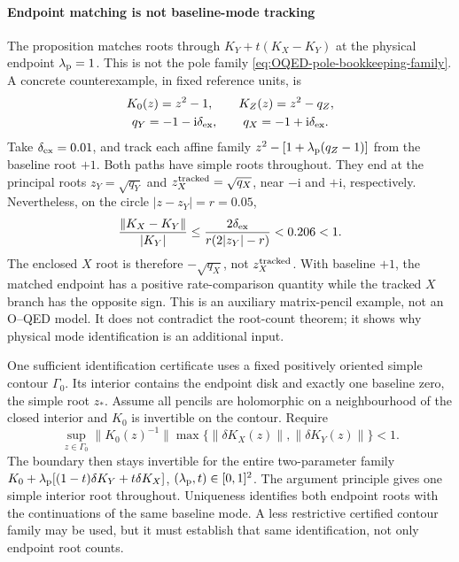 \documentclass[final,5p,times,twocolumn,numbers,nopreprintline]{elsarticle}
\numberwithin{equation}{section}
\theoremstyle{definition}
\theoremstyle{remark}
\newcommand{\ii}{\mathrm i}
\begin{document}
\paragraph{Endpoint matching is not baseline-mode tracking}
The proposition matches roots through \(K_Y+t(K_X-K_Y)\) at the
physical endpoint \(\lambda_{\rm p}=1\). This is not the pole family
\eqref{eq:OQED-pole-bookkeeping-family}. A concrete counterexample,
in fixed reference units, is
\[
 \begin{gathered}
 K_0(z)=z^2-1,\qquad K_Z(z)=z^2-q_Z,\\
 q_Y=-1-\ii\delta_{\rm ex},\qquad q_X=-1+\ii\delta_{\rm ex}.
 \end{gathered}
\]
Take \(\delta_{\rm ex}=0.01\), and track each affine family
\(z^2-[1+\lambda_{\rm p}(q_Z-1)]\) from the baseline root \(+1\).
Both paths have simple roots throughout. They end at the principal
roots \(z_Y=\sqrt{q_Y}\) and \(z_X^{\rm tracked}=\sqrt{q_X}\),
near \(-\ii\) and \(+\ii\), respectively. Nevertheless, on the
circle \(|z-z_Y|=r=0.05\),
\[
 \frac{\|K_X-K_Y\|}{|K_Y|}
 \leq\frac{2\delta_{\rm ex}}{r(2|z_Y|-r)}<0.206<1.
\]
The enclosed \(X\) root is therefore \(-\sqrt{q_X}\), not
\(z_X^{\rm tracked}\). With baseline \(+1\), the matched endpoint
has a positive rate-comparison quantity while the tracked \(X\) branch
has the opposite sign. This is an auxiliary matrix-pencil example, not an O--QED model. It
does not contradict the root-count theorem; it shows why physical mode
identification is an additional input.

One sufficient identification certificate uses a fixed positively
oriented simple contour \(\Gamma_0\). Its interior contains the endpoint
disk and exactly one baseline zero, the simple root \(z_*\). Assume
all pencils are holomorphic on a neighbourhood of the closed interior
and \(K_0\) is invertible on the contour. Require
\begin{equation}
 \sup_{z\in\Gamma_0}\|K_0(z)^{-1}\|
       \max\{\|\delta K_X(z)\|,\|\delta K_Y(z)\|\}<1.
 \label{eq:OQED-common-baseline-contour}
\end{equation}
The boundary then stays invertible for the entire two-parameter family
\(K_0+\lambda_{\rm p}[(1-t)\delta K_Y+t\delta K_X]\),
\((\lambda_{\rm p},t)\in[0,1]^2\). The argument principle gives
one simple interior root throughout. Uniqueness identifies both endpoint
roots with the continuations of the same baseline mode. A less restrictive
certified contour family may be used, but it must establish that same
identification, not only endpoint root counts.
\end{document}
